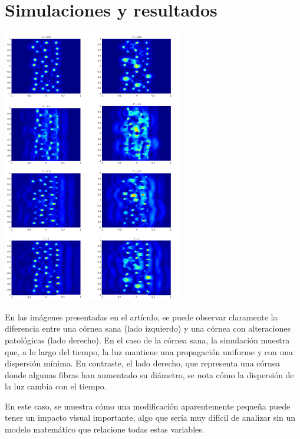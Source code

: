 \documentclass[10pt,a4paper]{article}
\begin{document}
\section{Simulaciones y resultados}
\begin{center}
	\includegraphics[scale=1]{resultados-corneas.png} 
\end{center}
En las imágenes presentadas en el artículo, se puede observar claramente la diferencia entre una córnea sana (lado izquierdo) y una córnea con alteraciones patológicas (lado derecho). En el caso de la córnea sana, la simulación muestra que, a lo largo del tiempo, la luz mantiene una propagación uniforme y con una dispersión mínima. En contraste, el lado derecho, que representa una córnea donde algunas fibras han aumentado su diámetro, se nota cómo la dispersión de la luz cambia con el tiempo.
 
En este caso, se muestra cómo una modificación aparentemente pequeña puede tener un impacto visual importante, algo que sería muy difícil de analizar sin un modelo matemático que relacione todas estas variables.
\end{document}

